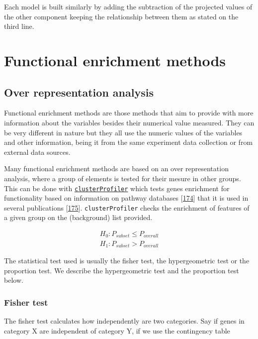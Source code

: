 \documentclass[
  12pt,
  a4paper,
  twoside,
  openright]{book}
\begin{document}
Each model is built similarly by adding the subtraction of the projected values of the other component keeping the relationship between them as stated on the third line.

\hypertarget{functional-enrichment-methods}{%
\section{Functional enrichment methods}\label{functional-enrichment-methods}}

\hypertarget{ORA}{%
\subsection{Over representation analysis}\label{ORA}}

Functional enrichment methods are those methods that aim to provide with more information about the variables besides their numerical value measured.
They can be very different in nature but they all use the numeric values of the variables and other information, being it from the same experiment data collection or from external data sources.

Many functional enrichment methods are based on an over representation analysis, where a group of elements is tested for their mesure in other groups.
This can be done with \href{https://bioconductor.org/packages/clusterProfiler}{\texttt{clusterProfiler}} which tests genes enrichment for functionality based on information on pathway databases {[}\protect\hyperlink{ref-wu2021}{174}{]} that it is used in several publications {[}\protect\hyperlink{ref-richter2021}{175}{]}.
\texttt{clusterProfiler} checks the enrichment of features of a given group on the (background) list provided.

\[
\begin{aligned}
H_0 : P_{subset} \leq  P_{overall} \\
H_1 : P_{subset} > P_{overall}
\end{aligned}
\]

The statistical test used is usually the fisher test, the hypergeometric test or the proportion test.
We describe the hypergeometric test and the proportion test below.

\hypertarget{fisher-test}{%
\subsubsection{Fisher test}\label{fisher-test}}

The fisher test calculates how independently are two categories.
Say if genes in category X are independent of category Y, if we use the contingency table
\end{document}
